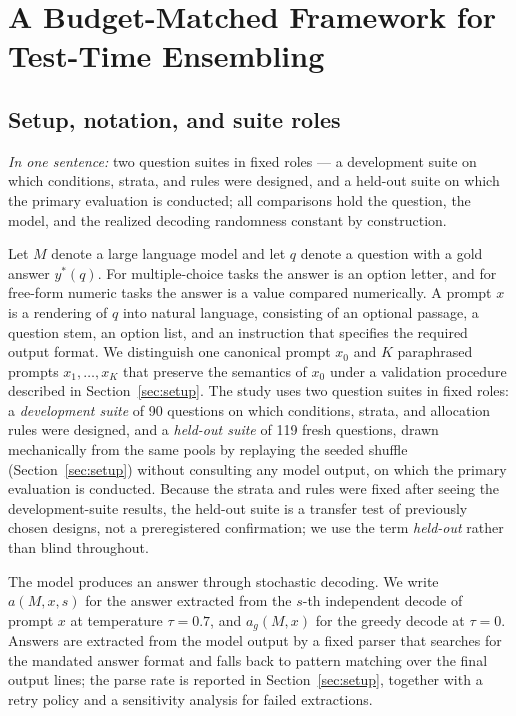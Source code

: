 \section{A Budget-Matched Framework for Test-Time Ensembling}
\label{sec:method}

\subsection{Setup, notation, and suite roles}

\emph{In one sentence:} two question suites in fixed roles --- a development suite on which conditions, strata, and rules were designed, and a held-out suite on which the primary evaluation is conducted; all comparisons hold the question, the model, and the realized decoding randomness constant by construction.

Let $M$ denote a large language model and let $q$ denote a question with a gold answer $y^*(q)$. For multiple-choice tasks the answer is an option letter, and for free-form numeric tasks the answer is a value compared numerically. A prompt $x$ is a rendering of $q$ into natural language, consisting of an optional passage, a question stem, an option list, and an instruction that specifies the required output format. We distinguish one canonical prompt $x_0$ and $K$ paraphrased prompts $x_1, \dots, x_K$ that preserve the semantics of $x_0$ under a validation procedure described in Section~\ref{sec:setup}. The study uses two question suites in fixed roles: a \emph{development suite} of 90 questions on which conditions, strata, and allocation rules were designed, and a \emph{held-out suite} of 119 fresh questions, drawn mechanically from the same pools by replaying the seeded shuffle (Section~\ref{sec:setup}) without consulting any model output, on which the primary evaluation is conducted. Because the strata and rules were fixed after seeing the development-suite results, the held-out suite is a transfer test of previously chosen designs, not a preregistered confirmation; we use the term \emph{held-out} rather than blind throughout.

The model produces an answer through stochastic decoding. We write $a(M, x, s)$ for the answer extracted from the $s$-th independent decode of prompt $x$ at temperature $\tau = 0.7$, and $a_g(M, x)$ for the greedy decode at $\tau = 0$. Answers are extracted from the model output by a fixed parser that searches for the mandated answer format and falls back to pattern matching over the final output lines; the parse rate is reported in Section~\ref{sec:setup}, together with a retry policy and a sensitivity analysis for failed extractions.

